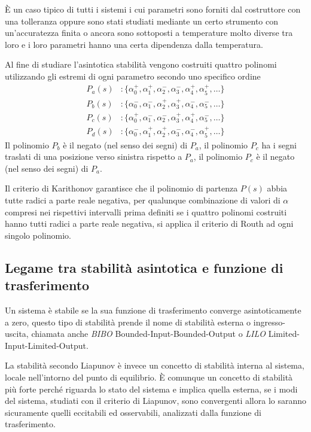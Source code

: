 È un caso tipico di tutti i sistemi i cui parametri sono forniti dal
costruttore con una tolleranza oppure sono stati studiati mediante un certo
strumento con un'accuratezza finita o ancora sono sottoposti a temperature
molto diverse tra loro e i loro parametri hanno una certa dipendenza dalla
temperatura.

Al fine di studiare l'asintotica stabilità vengono costruiti quattro polinomi
utilizzando gli estremi di ogni parametro secondo uno specifico ordine
$$
\begin{aligned}
P_a(s) &:
\{\alpha_0^+,\alpha_1^+,\alpha_2^-,\alpha_3^-,\alpha_4^+,\alpha_5^+,\ldots\}\\
P_b(s) &:
\{\alpha_0^-,\alpha_1^-,\alpha_2^+,\alpha_3^+,\alpha_4^-,\alpha_5^-,\ldots\}\\
P_c(s) &:
\{\alpha_0^+,\alpha_1^-,\alpha_2^-,\alpha_3^+,\alpha_4^+,\alpha_5^-,\ldots\}\\
P_d(s) &:
\{\alpha_0^-,\alpha_1^+,\alpha_2^+,\alpha_3^-,\alpha_4^-,\alpha_5^+,\ldots\}
\end{aligned}
$$
Il polinomio $P_b$ è il negato (nel senso dei segni) di $P_a$, il polinomio
$P_c$ ha i segni traslati di una posizione verso sinistra rispetto a $P_a$, il
polinomio $P_c$ è il negato (nel senso dei segni) di $P_a$.

Il criterio di Karithonov garantisce che il polinomio di partenza $P(s)$ abbia
tutte radici a parte reale negativa, per qualunque combinazione di valori di
$\alpha$ compresi nei rispettivi intervalli prima definiti se i quattro
polinomi costruiti hanno tutti radici a parte reale negativa, si applica il
criterio di Routh ad ogni singolo polinomio.

\subsection{Legame tra stabilità asintotica e funzione di trasferimento}
Un sistema è stabile se la sua funzione di trasferimento converge
asintoticamente a zero, questo tipo di stabilità prende il nome di stabilità
esterna o ingresso-uscita, chiamata anche \textit{BIBO}
Bounded-Input-Bounded-Output o \textit{LILO} Limited-Input-Limited-Output.

La stabilità secondo Liapunov è invece un concetto di stabilità interna al
sistema, locale nell'intorno del punto di equilibrio. È comunque un concetto di
stabilità più forte perché riguarda lo stato del sistema e implica quella
esterna, se i modi del sistema, studiati con il criterio di Liapunov, sono
convergenti allora lo saranno sicuramente quelli eccitabili ed osservabili,
analizzati dalla funzione di trasferimento.


